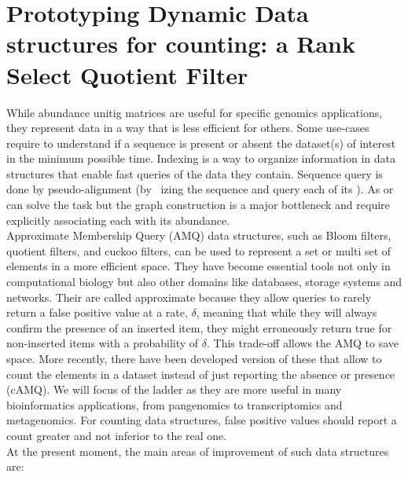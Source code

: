 \section{Prototyping Dynamic Data structures for \kmer counting: a Rank Select Quotient Filter}
\label{sec:qf}
While abundance unitig matrices are useful for specific genomics applications, they represent data in a way that is less efficient for others. Some use-cases require to understand if a sequence is present or absent the dataset(s) of interest in the minimum possible time. Indexing is a way to organize information in data structures that enable fast queries of the data they contain. Sequence query is done by pseudo-alignment (by \kmer~izing the sequence and query each of its \kmers). As \cdbg or \ccdbg can solve the task but the graph construction is a major bottleneck and require explicitly associating each \kmer with its abundance. \\
Approximate Membership Query (AMQ) data structures, such as Bloom filters, quotient filters, and cuckoo filters, can be used to represent a set or multi set of elements in a more efficient space. They have become essential tools not only in computational biology but also other domains like databases, storage systems and networks. Their are called approximate because they allow queries to rarely return a false positive value at a rate, $\delta$, meaning that while they will always confirm the presence of an inserted item, they might erroneously return true for non-inserted items with a probability of $\delta$. This trade-off allows the AMQ to save space. More recently, there have been developed version of these that allow to count the elements in a dataset instead of just reporting the absence or presence (cAMQ). We will focus of the ladder as they are more useful in many bioinformatics applications, from pangenomics to transcriptomics and metagenomics. For counting data structures, false positive values should report a count greater and not inferior to the real one.\\
At the present moment, the main areas of improvement of such data structures are:
